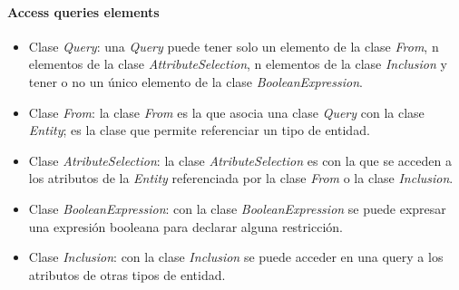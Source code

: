 \paragraph*{Access queries elements}


\begin{itemize}
    
    \item Clase \textit{Query}: una \textit{Query} puede tener solo un elemento de la clase \textit{From}, n elementos de la clase \textit{AttributeSelection}, n elementos de la clase \textit{Inclusion} y tener o no un único elemento de la clase \textit{BooleanExpression}.
    \item Clase \textit{From}: la clase \textit{From} es la que asocia una clase \textit{Query} con la clase \textit{Entity}; es la clase que permite referenciar un tipo de entidad.
    \item Clase \textit{AtributeSelection}: la clase \textit{AtributeSelection} es con la que se acceden a los atributos de la \textit{Entity} referenciada por la clase \textit{From} o la clase \textit{Inclusion}.
    \item Clase \textit{BooleanExpression}: con la clase \textit{BooleanExpression} se puede expresar una expresión booleana para declarar alguna restricción.
    \item Clase \textit{Inclusion}: con la clase \textit{Inclusion} se puede acceder en una query a los atributos de otras tipos de entidad.
    
\end{itemize}
